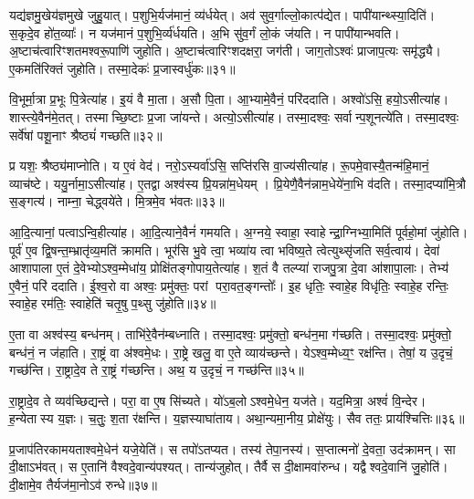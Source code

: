 यद्य॑ज्ञमु॒खेय॑ज्ञमुखे जुहु॒यात्।
प॒शुभि॒र्यज॑मानं॒ व्य॑र्धयेत्।
अव॑ सुव॒र्गाल्लो॒कात्प॑द्येत।
पापी॑यान्थ्स्या॒दिति॑।
स॒कृदे॒व हो॑त॒व्याः᳚।
न यज॑मानं प॒शुभि॒र्व्य॑र्धयति।
अ॒भि सु॑व॒र्गं लो॒कं ज॑यति।
न पापी॑यान्भवति।
अ॒ष्टाच॑त्वारिꣳशतमश्वरू॒पाणि॑ जुहोति।
अ॒ष्टाच॑त्वारिꣳशदक्षरा॒ जग॑ती।
जाग॒तो\-ऽश्वः॑ प्राजाप॒त्यः समृ॑द्ध्यै।
ए॒कमति॑रिक्तं जुहोति।
तस्मा॒देकः॑ प्र॒जास्वर्धु॑कः॥३१॥\anuvakamend[अ॒र्ध॒य॒ति॒ ज॒न॒य॒ति॒ खल्वा॑हु॒र्जग॑ती॒ त्रीणि॑ च]

वि॒भूर्मा॒त्रा प्र॒भूः पि॒त्रेत्या॑ह।
इ॒यं वै मा॒ता।
अ॒सौ पि॒ता।
आ॒भ्यामे॒वैनं॒ परि॑ददाति।
अश्वो॑ऽसि॒ हयो॒\-ऽसीत्या॑ह।
शास्त्ये॒वैन॑मे॒तत्।
तस्माच्छि॒ष्टाः प्र॒जा जा॑यन्ते।
अत्यो॒\-ऽसीत्या॑ह।
तस्मा॒दश्वः॒ सर्वान्प॒शूनत्ये॑ति।
तस्मा॒दश्वः॒ सर्वे॑षां पशू॒नाꣳ श्रैष्ठ्यं॑ गच्छति॥३२॥

प्र यशः॒ श्रैष्ठ्य॑माप्नोति।
य ए॒वं वेद॑।
नरो॒ऽस्यर्वा॑ऽसि॒ सप्ति॑रसि वा॒ज्य॑सीत्या॑ह।
रू॒पमे॒वास्यै॒तन्म॑हि॒मानं॒ व्याच॑ष्टे।
ययु॒र्नामा॒\-ऽसीत्या॑ह।
ए॒तद्वा अश्व॑स्य प्रि॒यन्ना॑म॒धेयम्।
प्रि॒येणै॒वैन॑न्नाम॒धेये॑ना॒भि व॑दति।
तस्मा॒दप्या॑मि॒त्रौ स॒ङ्गत्य॑।
नाम्ना॒ चेद्ध्वये॑ते।
मि॒त्रमे॒व भ॑वतः॥३३॥

आ॒दि॒त्यानां॒ पत्वा\-ऽन्वि॒हीत्या॑ह।
आ॒दि॒त्याने॒वैनं॑ गमयति।
अ॒ग्नये॒ स्वाहा॒ स्वाहेन्द्रा॒ग्निभ्या॒मिति॑ पूर्वहो॒मां जु॑होति।
पूर्व॑ ए॒व द्वि॒षन्त॒म्भ्रातृ॑व्य॒मति॑ क्रामति।
भूर॑सि भु॒वे त्वा॒ भव्या॑य त्वा भविष्य॒ते त्वेत्युथ्सृ॑जति सर्व॒त्वाय॑।
देवा॑ आशापाला ए॒तं दे॒वेभ्यो\-ऽश्व॒म्मेधा॑य॒ प्रोक्षि॑तङ्गोपाय॒तेत्या॑ह।
श॒तं वै तल्प्या॑ राजपु॒त्रा दे॒वा आ॑शापा॒लाः।
तेभ्य॑ ए॒वैनं॒ परि॑ ददाति।
ई॒श्व॒रो वा अश्वः॒ प्रमु॑क्तः॒ परां परा॒वत॒ङ्गन्तोः᳚।
इ॒ह धृतिः॒ स्वाहे॒ह विधृ॑तिः॒ स्वाहे॒ह रन्तिः॒ स्वाहे॒ह रम॑तिः॒ स्वाहेति॑ चतृ॒षु प॒थ्सु जु॑होति॥३४॥

ए॒ता वा अश्व॑स्य॒ बन्ध॑नम्।
ताभि॑रे॒वैन॑म्बध्नाति।
तस्मा॒दश्वः॒ प्रमु॑क्तो॒ बन्ध॑न॒मा ग॑च्छति।
तस्मा॒दश्वः॒ प्रमु॑क्तो॒ बन्ध॑नं॒ न ज॑हाति।
रा॒ष्ट्रं वा अ॑श्वमे॒धः।
रा॒ष्ट्रे खलु॒ वा ए॒ते व्याय॑च्छन्ते।
येऽश्व॒म्मेध्य॒ꣳ॒ रक्ष॑न्ति।
तेषां॒ य उ॒दृचं॒ गच्छ॑न्ति।
रा॒ष्ट्रादे॒व ते रा॒ष्ट्रं ग॑च्छन्ति।
अथ॒ य उ॒दृचं॒ न गच्छ॑न्ति॥३५॥

रा॒ष्ट्रादे॒व ते व्यव॑च्छिद्यन्ते।
परा॒ वा ए॒ष सि॑च्यते।
यो॑ऽब॒लो\-ऽश्वमे॒धेन॒ यज॑ते।
यद॒मित्रा॒ अश्वं॑ वि॒न्देर\sn{}।
ह॒न्येतास्य य॒ज्ञः।
च॒तुः॒ श॒ता र॑क्षन्ति।
य॒ज्ञस्याघा॑ताय।
अथा॒न्यमा॒नीय॒ प्रोक्षे॑युः।
सैव ततः॒ प्राय॑श्चित्तिः॥३६॥\anuvakamend[ग॒च्छ॒ति॒ भ॒व॒तः॒ प॒थ्सु जु॑होति॒ न गच्छ॑न्ति॒ नव॑ च]

प्र॒जाप॑तिरकामयताश्वमे॒धेन॑ यजे॒येति॑।
स तपो॑\-ऽतप्यत।
तस्य॑ तेपा॒नस्य॑।
स॒प्तात्मनो॑ दे॒वता॒ उद॑क्रामन्।
सा दी॒क्षा\-ऽभ॑वत्।
स ए॒तानि॑ वैश्वदे॒वान्य॑पश्यत्।
तान्य॑जुहोत्।
तैर्वै स दी॒क्षामवा॑रुन्ध।
यद्वैश्वदे॒वानि॑ जु॒होति॑।
दी॒क्षामे॒व तैर्यज॑मा॒नोऽव॑ रुन्धे॥३७॥

